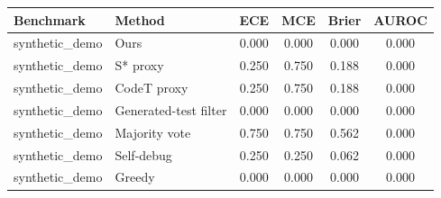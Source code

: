 \begin{tabular}{llcccc}
\toprule
Benchmark & Method & ECE & MCE & Brier & AUROC \\
\midrule
synthetic_demo & Ours & 0.000 & 0.000 & 0.000 & 0.000 \\
synthetic_demo & S* proxy & 0.250 & 0.750 & 0.188 & 0.000 \\
synthetic_demo & CodeT proxy & 0.250 & 0.750 & 0.188 & 0.000 \\
synthetic_demo & Generated-test filter & 0.000 & 0.000 & 0.000 & 0.000 \\
synthetic_demo & Majority vote & 0.750 & 0.750 & 0.562 & 0.000 \\
synthetic_demo & Self-debug & 0.250 & 0.250 & 0.062 & 0.000 \\
synthetic_demo & Greedy & 0.000 & 0.000 & 0.000 & 0.000 \\
\bottomrule
\end{tabular}
